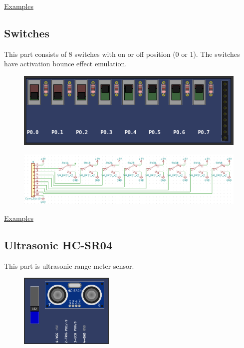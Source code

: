 \href{https://lcgamboa.github.io/picsimlab_examples/parts_SHT3X_(Temp._Hum.).html}{Examples}



\subsection{Switches}
This part consists of 8 switches with on or off position (0 or 1).
The switches have activation bounce effect emulation.

\begin{figure}[H]
\center
\includegraphics[width=0.99\textwidth]{img/part_switches.png} 
\end{figure} 

\begin{figure}[H]
\center
\includegraphics[width=0.99\textwidth]{img/part_switches_.png} 
\end{figure} 

\href{https://lcgamboa.github.io/picsimlab_examples/parts_Switches.html}{Examples}



\subsection{Ultrasonic HC-SR04}
This part is ultrasonic range meter sensor.

\begin{figure}[H]
\center
\includegraphics[width=0.4\textwidth]{img/part_hcsr04.png} 
\end{figure} 


